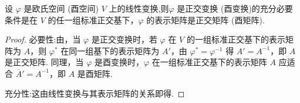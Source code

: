 \documentclass[../../main.tex]{subfiles}%
\begin{document}
\begin{theorem}\label{theorem:正交变换和酉变换关于表示矩阵的充要条件}
设 $\varphi$ 是欧氏空间 (酉空间) $V$ 上的线性变换,则$\varphi$ 是正交变换 (酉变换)的充分必要条件是在 $V$ 的任一组标准正交基下，$\varphi$ 的表示矩阵是正交矩阵 (酉矩阵).
\end{theorem}
\begin{proof}
必要性:由，当 $\varphi$ 是正交变换时，若 $\varphi$ 在 $V$ 的一组标准正交基下的表示矩阵为 $A$，则 $\varphi^*$ 在同一组基下的表示矩阵为 $A'$，由 $\varphi^* = \varphi^{-1}$ 得 $A' = A^{-1}$，即 $A$ 是正交矩阵. 同理，当 $\varphi$ 是酉变换时，$\varphi$ 在一组标准正交基下的表示矩阵 $A$ 应适合 $\overline{A}' = A^{-1}$，即 $A$ 是酉矩阵.

充分性:这由线性变换与其表示矩阵的关系即得.
\end{proof}
\end{document}
